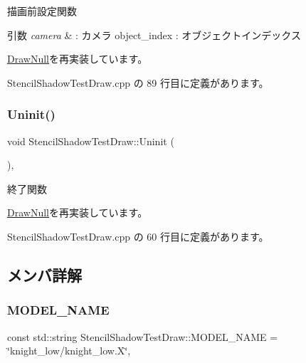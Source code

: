 描画前設定関数 


\begin{DoxyParams}{引数}
{\em camera} & \+: カメラ object\+\_\+index \+: オブジェクトインデックス \\
\hline
\end{DoxyParams}


\mbox{\hyperlink{class_draw_null_a3baf78b024837c8ebb2471e7505db6ea}{Draw\+Null}}を再実装しています。



 Stencil\+Shadow\+Test\+Draw.\+cpp の 89 行目に定義があります。

\mbox{\label{class_stencil_shadow_test_draw_ad0672bf4ecfc8091cf54ed6f2c76b618}} 
\subsubsection{\texorpdfstring{Uninit()}{Uninit()}}
{\footnotesize\ttfamily void Stencil\+Shadow\+Test\+Draw\+::\+Uninit (\begin{DoxyParamCaption}{ }\end{DoxyParamCaption})\hspace{0.3cm}{\ttfamily [override]}, {\ttfamily [virtual]}}



終了関数 



\mbox{\hyperlink{class_draw_null_a6e81d63efab7333e8d0e8af99362a4d9}{Draw\+Null}}を再実装しています。



 Stencil\+Shadow\+Test\+Draw.\+cpp の 60 行目に定義があります。



\subsection{メンバ詳解}
\mbox{\label{class_stencil_shadow_test_draw_a1ef49214f41a9fa1f3c2a7616eaf5655}} 
\subsubsection{\texorpdfstring{M\+O\+D\+E\+L\+\_\+\+N\+A\+ME}{MODEL\_NAME}}
{\footnotesize\ttfamily const std\+::string Stencil\+Shadow\+Test\+Draw\+::\+M\+O\+D\+E\+L\+\_\+\+N\+A\+ME = \char`\"{}knight\+\_\+low/knight\+\_\+low.\+X\char`\"{}\hspace{0.3cm}{\ttfamily [static]}, {\ttfamily [private]}}



